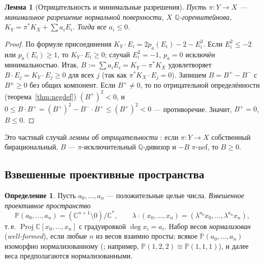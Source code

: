 \documentclass[11pt,a4paper]{article}
\theoremstyle{plain}
\newtheorem{lemma}[theorem]{Лемма}
\theoremstyle{definition}
\newtheorem{definition}[theorem]{Определение}
\theoremstyle{remark}
\renewcommand{\C}{\mathbb{C}}
\newcommand{\Q}{\mathbb{Q}}
\newcommand{\PP}{\mathbb{P}}
\DeclareMathOperator{\Proj}{Proj}
\begin{document}
\begin{lemma}[Отрицательность и минимальные разрешения]\label{lem:minimal-discrep}
Пусть $\pi\colon Y\to X$ --- минимальное разрешение нормальной поверхности, $X$ $\Q$-горенштейнова,
$K_Y=\pi^*K_X+\sum a_iE_i$. Тогда все $a_i\le0$.
\end{lemma}
\begin{proof}
По формуле присоединения \cite[5.8]{AG} $K_Y\cdot E_i=2p_a(E_i)-2-E_i^2$. Если $E_i^2\le-2$ или
$p_a(E_i)\ge1$, то $K_Y\cdot E_i\ge0$; случай $E_i^2=-1$, $p_a=0$ исключён минимальностью. Итак,
$B:=\sum a_iE_i=K_Y-\pi^*K_X$ удовлетворяет $B\cdot E_j=K_Y\cdot E_j\ge0$ для всех $j$
(так как $\pi^*K_X\cdot E_j=0$). Запишем $B=B^+-B^-$ с $B^\pm\ge0$ без общих компонент. Если
$B^+\ne0$, то по отрицательной определённости (теорема~\ref{thm:negdef}) $(B^+)^2<0$, и
$0\le B\cdot B^+=(B^+)^2-B^-\cdot B^+\le(B^+)^2<0$ --- противоречие. Значит, $B^+=0$, $B\le0$.
\end{proof}

Это частный случай \emph{леммы об отрицательности} \cite[3.39]{KM}: если $\pi\colon Y\to X$
собственный бирациональный, $B$ --- $\pi$-исключительный $\Q$-дивизор и $-B$ $\pi$-nef, то $B\ge0$.

\subsection{Взвешенные проективные пространства}\label{ss:wps}

\begin{definition}
Пусть $a_0,\dots,a_n$ --- положительные целые числа. \emph{Взвешенное проективное пространство}
\[
\PP(a_0,\dots,a_n)=(\C^{n+1}\setminus0)/\C^*,\qquad \lambda\cdot(x_0,\dots,x_n)=(\lambda^{a_0}x_0,\dots,\lambda^{a_n}x_n),
\]
т.\,е. $\Proj\C[x_0,\dots,x_n]$ с градуировкой $\deg x_i=a_i$. Набор весов \emph{нормализован}
(\emph{well-formed}), если любые $n$ из весов взаимно просты; всякое $\PP(a_0,\dots,a_n)$
изоморфно нормализованному (\cite[1.3]{Dolg-WPS}; например, $\PP(1,2,2)\cong\PP(1,1,1)$), и далее
веса предполагаются нормализованными.
\end{definition}
\end{document}
